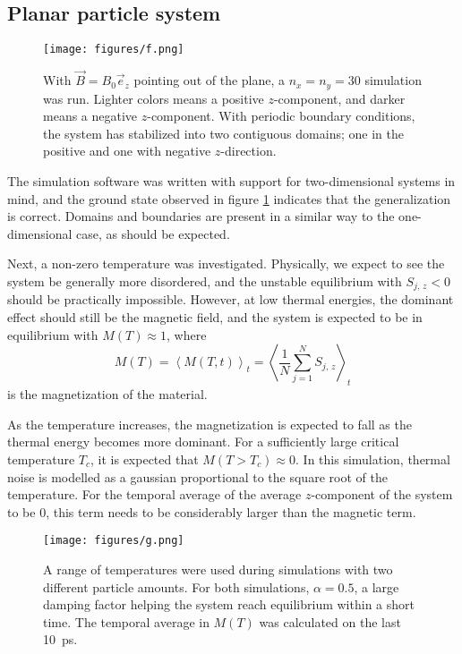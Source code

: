 \subsection*{Planar particle system}

\begin{figure}
    \centering
    \texttt{[image: figures/f.png]}
    \caption{
        With $\vec{B} = B_0\vec{e}_z$ pointing out of the plane, a $n_x = n_y = 30$ simulation was run.
        Lighter colors means a positive $z$-component, and darker means a negative $z$-component. 
        With periodic boundary conditions, the system has stabilized into two contiguous domains;
        one in the positive and one with negative $z$-direction.
    }
    \label{fig:g}
\end{figure}

The simulation software was written with support for two-dimensional systems in mind, 
and the ground state observed in figure \ref{fig:g} indicates that the generalization is correct. 
Domains and boundaries are present in a similar way to the one-dimensional case, as should be expected.

Next, a non-zero temperature was investigated. 
Physically, we expect to see the system be generally more disordered, 
and the unstable equilibrium with $S_{j,\,z} < 0$ should be practically impossible. 
However, at low thermal energies, the dominant effect should still be the magnetic field, 
and the system is expected to be in equilibrium with $M(T) \approx 1$, where 
\begin{equation*}
    M(T) = \left<M(T, t)\right>_t = \left<\frac{1}{N}\sum_{j = 1}^NS_{j,\,z}\right>_t
\end{equation*}
is the magnetization of the material.

As the temperature increases, the magnetization is expected to fall as the thermal energy becomes more dominant. 
For a sufficiently large critical temperature $T_c$, it is expected that $M(T > T_c) \approx 0$.
In this simulation, thermal noise is modelled as a gaussian proportional to the square root of the temperature.
For the temporal average of the average $z$-component of the system to be 0, 
this term needs to be considerably larger than the magnetic term. 

\begin{figure}
    \centering
    \texttt{[image: figures/g.png]}
    \caption{
        A range of temperatures were used during simulations with two different particle amounts.
        For both simulations, $\alpha = 0.5$, a large damping factor helping the system reach equilibrium
        within a short time. The temporal average in $M(T)$ was calculated on the last \SI{10}{\pico\second}.
    }
    \label{fig:h}
\end{figure}

